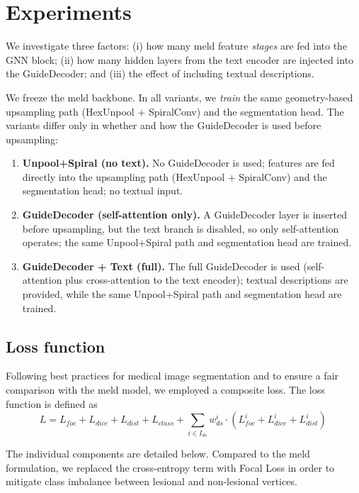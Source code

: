 \documentclass[FCD_GNN.tex]{subfiles}
\begin{document}
\chapter{Experiments}
\label{chapter:Experiments}

We investigate three factors: (i) how many \ac{meld} feature \emph{stages} are fed into the GNN block; (ii) how many hidden layers from the text encoder are injected into the GuideDecoder; and (iii) the effect of including textual descriptions. 

We freeze the \ac{meld} backbone. In all variants, we \emph{train} the same geometry-based upsampling path
(HexUnpool + SpiralConv) and the segmentation head. The variants differ only in whether and how
the GuideDecoder is used before upsampling:

\begin{enumerate}
  \item \textbf{Unpool+Spiral (no text).} No GuideDecoder is used; features are fed directly into the
        upsampling path (HexUnpool + SpiralConv) and the segmentation head; no textual input.
  \item \textbf{GuideDecoder (self-attention only).} A GuideDecoder layer is inserted before upsampling,
        but the text branch is disabled, so only self-attention operates; the same Unpool+Spiral path and
        segmentation head are trained.
  \item \textbf{GuideDecoder + Text (full).} The full GuideDecoder is used (self-attention plus
        cross-attention to the text encoder); textual descriptions are provided, while the same
        Unpool+Spiral path and segmentation head are trained.
\end{enumerate}

\section{Loss function}
Following best practices for medical image segmentation and to ensure a fair comparison with the \ac{meld} model, we employed a composite loss. The loss function is defined as
\begin{equation}
L = L_{foc} + L_{dice} + L_{dist} + L_{class} + \sum_{i \in I_{ds}} w^i_{ds} \cdot (L^i_{foc} + L^i_{dice} + L^i_{dist})\,
\end{equation}
\par\noindent
The individual components are detailed below. Compared to the \ac{meld} formulation, we replaced the cross-entropy term with Focal Loss in order to mitigate class imbalance between lesional and non-lesional vertices.
\end{document}
